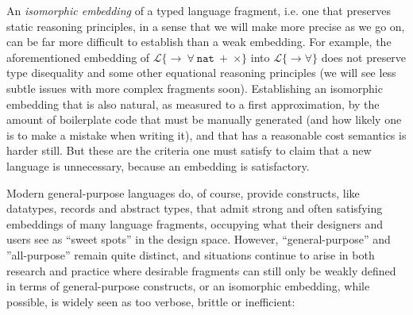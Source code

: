 An \emph{isomorphic embedding} of a typed language fragment, i.e. one that preserves static reasoning principles, in a sense that we will make more precise as we go on, can be far more difficult to establish than a weak embedding. For example, the aforementioned embedding of $\mathcal{L}\{{\rightarrow}~{\forall}~\mathtt{nat}~{+}~{\times}\}$ into $\mathcal{L}\{\rightarrow\forall\}$ does not preserve type disequality and some other equational reasoning principles (we will see less subtle issues with more complex fragments soon). Establishing an isomorphic embedding that is also natural, as measured to a first approximation, by the amount of boilerplate code that must be manually generated (and how likely one is to make a mistake when writing it), and that has a reasonable cost semantics is harder still. But these are the criteria one must satisfy to claim that a new language is unnecessary, because an embedding is satisfactory.

Modern general-purpose languages do, of course, provide constructs, like datatypes, records and abstract types, that admit strong and often satisfying embeddings of many language fragments, occupying what their designers and users see as ``sweet spots'' in the design space. However, ``general-purpose'' and ''all-purpose'' remain quite distinct, and situations continue to arise in both research and practice where desirable fragments can still only be weakly defined in terms of general-purpose constructs, or an isomorphic embedding, while possible, is widely seen as too verbose, brittle or inefficient:

